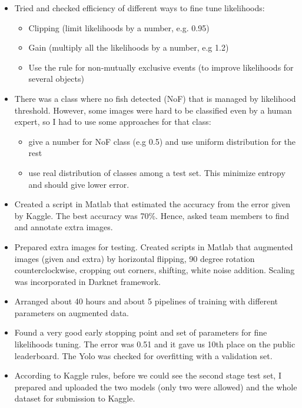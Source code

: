 \documentclass[a4paper]{article}
\begin{document}
\begin{itemize}
	\item Tried and checked efficiency of different ways to fine tune likelihoods:
	\begin{itemize}
		\item Clipping (limit likelihoods by a number, e.g. 0.95) 
		\item Gain (multiply all the likelihoods by a number, e.g 1.2) 
		\item Use the rule for non-mutually exclusive events (to improve likelihoods for several objects)
	\end{itemize}
	
		\item There was a class where no fish detected (NoF) that is managed by likelihood threshold. However, some images were hard to be classified even by a human expert, so I had to use some approaches for that class:
	\begin{itemize}
	\item give a number for NoF class (e.g 0.5) and use uniform distribution for the rest
	\item use real distribution of classes among a test set. This minimize entropy and should give lower error.
	\end{itemize}
	
	\item Created a script in Matlab that estimated the accuracy from the error given by Kaggle. The best accuracy was 70\%. Hence, asked team members to find and annotate extra images.
	
	\item Prepared extra images for testing. Created scripts in Matlab that augmented images (given and extra) by horizontal flipping, 90 degree rotation counterclockwise, cropping out corners, shifting, white noise addition. Scaling was incorporated in Darknet framework.
	
	\item Arranged about 40 hours and about 5 pipelines of training with different parameters on augmented data. 
	
	\item Found a very good early stopping point and set of parameters for fine likelihoods tuning. The error was 0.51 and it gave us 10th place on the public leaderboard. The Yolo was checked for overfitting with a validation set. 
	
	\item According to Kaggle rules, before we could see the second stage test set, I prepared and uploaded the two models (only two were allowed) and the whole dataset for submission to Kaggle.
	

\end{itemize}
\end{document}
